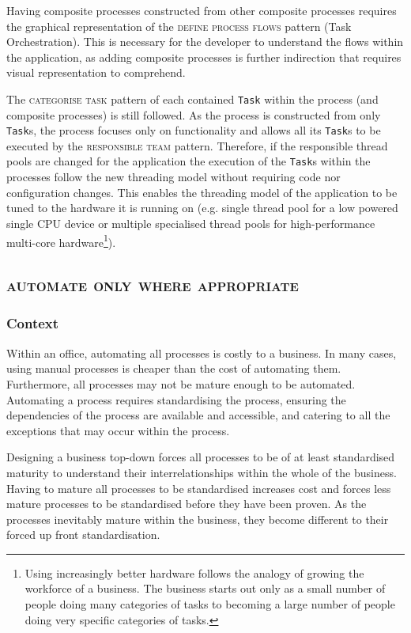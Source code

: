 \documentclass[prodmode]{style/acmlarge}
\begin{document}
Having composite processes constructed from other composite processes requires
the graphical representation of the \textsc{define process flows} pattern (Task
Orchestration).  This is necessary for the developer to understand the flows
within the application, as adding composite processes is further indirection
that requires visual representation to comprehend.

The \textsc{categorise task} pattern of each contained \texttt{Task} within the
process (and composite processes) is still followed.  As the process is
constructed from only \texttt{Task}s, the process focuses only on functionality
and allows all its \texttt{Task}s to be executed by the \textsc{responsible
team} pattern.  Therefore, if the responsible thread pools are changed for the
application the execution of the \texttt{Task}s within the processes follow the new
threading model without requiring code nor configuration changes.  This enables
the threading model of the application to be tuned to the hardware it is running
on (e.g. single thread pool for a low powered single CPU device or multiple
specialised thread pools for high-performance multi-core hardware\footnote{Using
increasingly better hardware follows the analogy of growing the workforce of a
business.  The business starts out only as a small number of people doing many
categories of tasks to becoming a large number of people doing very specific
categories of tasks.}).



\subsection{\textsc{\textbf{automate only where appropriate}}}

\subsubsection*{Context} Within an office, automating all processes is costly to
a business.  In many cases, using manual processes is cheaper than the cost of
automating them.  Furthermore, all processes may not be mature enough to be
automated.  Automating a process requires standardising the process, ensuring
the dependencies of the process are available and accessible, and catering to
all the exceptions that may occur within the process.

Designing a business top-down forces all processes to be of at least
standardised maturity to understand their interrelationships within the whole of
the business.  Having to mature all processes to be standardised increases cost
and forces less mature processes to be standardised before they have been
proven.  As the processes inevitably mature within the business, they become
different to their forced up front standardisation.
\end{document}
